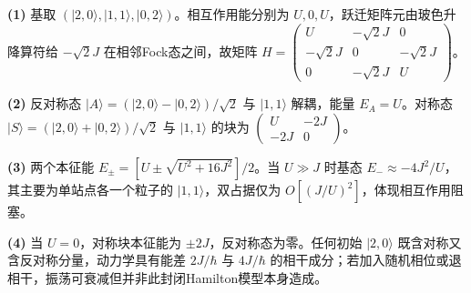 \par\noindent\textbf{(1)} 基取 \((|2,0\rangle,|1,1\rangle,|0,2\rangle)\)。相互作用能分别为 \(U,0,U\)，跃迁矩阵元由玻色升降算符给 \(-\sqrt2J\) 在相邻Fock态之间，故矩阵 \(H=\begin{pmatrix}U&-\sqrt2J&0\\-\sqrt2J&0&-\sqrt2J\\0&-\sqrt2J&U\end{pmatrix}\)。
\par\noindent\textbf{(2)} 反对称态 \(|A\rangle=(|2,0\rangle-|0,2\rangle)/\sqrt2\) 与 \(|1,1\rangle\) 解耦，能量 \(E_A=U\)。对称态 \(|S\rangle=(|2,0\rangle+|0,2\rangle)/\sqrt2\) 与 \(|1,1\rangle\) 的块为 \(\begin{pmatrix}U&-2J\\-2J&0\end{pmatrix}\)。
\par\noindent\textbf{(3)} 两个本征能 \(E_\pm=[U\pm\sqrt{U^2+16J^2}]/2\)。当 \(U\gg J\) 时基态 \(E_-\approx-4J^2/U\)，其主要为单站点各一个粒子的 \(|1,1\rangle\)，双占据仅为 \(O[(J/U)^2]\)，体现相互作用阻塞。
\par\noindent\textbf{(4)} 当 \(U=0\)，对称块本征能为 \(\pm2J\)，反对称态为零。任何初始 \(|2,0\rangle\) 既含对称又含反对称分量，动力学具有能差 \(2J/\hbar\) 与 \(4J/\hbar\) 的相干成分；若加入随机相位或退相干，振荡可衰减但并非此封闭Hamilton模型本身造成。
